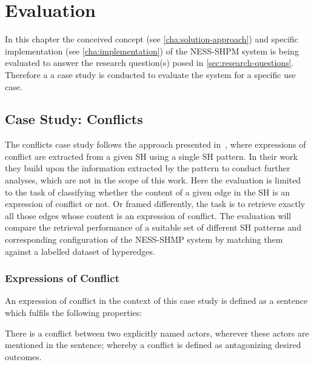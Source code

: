 \documentclass[11pt]{scrreprt}
\let\citef\cite  %
\let\cite\parencite  %
\begin{document}
\chapter{Evaluation}
\label{cha:evaluation}
In this chapter the conceived concept (see \cref{cha:solution-approach}) and specific implementation (see \cref{cha:implementation}) of the NESS-SHPM system is being evaluated to answer the research question(s) posed in \cref{sec:research-questions}. Therefore a a case study is conducted to evaluate the system for a specific use case. 

\section{Case Study: Conflicts}
The conflicts case study follows the approach presented in \citef{menezesSemanticHypergraphs2021}, where expressions of conflict are extracted from a given SH using a single SH pattern. In their work they build upon the information extracted by the pattern to conduct further analyses, which are not in the scope of this work. Here the evaluation is limited to the task of classifying whether the content of a given edge in the SH is an expression of conflict or not. Or framed differently, the task is to retrieve exactly all those edges whose content is an expression of conflict. The evaluation will compare the retrieval performance of a suitable set of different SH patterns and corresponding configuration of the NESS-SHMP system by matching them against a labelled dataset of hyperedges.


\subsection{Expressions of Conflict}
\label{sec:conflict-definition}
An expression of conflict in the context of this case study is defined as a sentence which fulfils the following properties:

\begin{displayquote}
There is a conflict between two explicitly named actors, wherever these actors are mentioned in the sentence; whereby a conflict is defined as antagonizing desired outcomes.
\end{displayquote}
\end{document}
